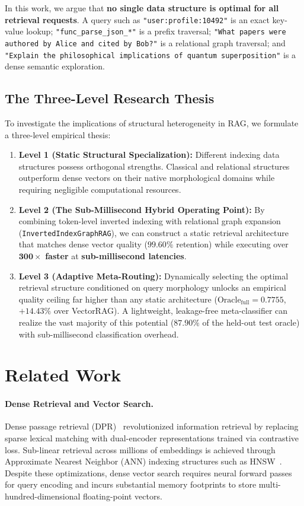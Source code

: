 \documentclass[10pt,twocolumn,letterpaper]{article}
\begin{document}
In this work, we argue that \textbf{no single data structure is optimal for all retrieval requests}. A query such as \texttt{"user:profile:10492"} is an exact key-value lookup; \texttt{"func\_parse\_json\_*"} is a prefix traversal; \texttt{"What papers were authored by Alice and cited by Bob?"} is a relational graph traversal; and \texttt{"Explain the philosophical implications of quantum superposition"} is a dense semantic exploration.

\subsection{The Three-Level Research Thesis}
To investigate the implications of structural heterogeneity in RAG, we formulate a three-level empirical thesis:
\begin{enumerate}
    \item \textbf{Level 1 (Static Structural Specialization):} Different indexing data structures possess orthogonal strengths. Classical and relational structures outperform dense vectors on their native morphological domains while requiring negligible computational resources.
    \item \textbf{Level 2 (The Sub-Millisecond Hybrid Operating Point):} By combining token-level inverted indexing with relational graph expansion (\texttt{InvertedIndexGraphRAG}), we can construct a static retrieval architecture that matches dense vector quality ($99.60\%$ retention) while executing over $\mathbf{300\times}$ \textbf{faster} at \textbf{sub-millisecond latencies}.
    \item \textbf{Level 3 (Adaptive Meta-Routing):} Dynamically selecting the optimal retrieval structure conditioned on query morphology unlocks an empirical quality ceiling far higher than any static architecture ($\text{Oracle}_{\text{full}} = 0.7755$, $+14.43\%$ over VectorRAG). A lightweight, leakage-free meta-classifier can realize the vast majority of this potential ($87.90\%$ of the held-out test oracle) with sub-millisecond classification overhead.
\end{enumerate}

\section{Related Work}

\paragraph{Dense Retrieval and Vector Search.}
Dense passage retrieval (DPR)~\cite{karpukhin2020dense} revolutionized information retrieval by replacing sparse lexical matching with dual-encoder representations trained via contrastive loss. Sub-linear retrieval across millions of embeddings is achieved through Approximate Nearest Neighbor (ANN) indexing structures such as HNSW~\cite{malkov2018efficient}. Despite these optimizations, dense vector search requires neural forward passes for query encoding and incurs substantial memory footprints to store multi-hundred-dimensional floating-point vectors.
\end{document}
